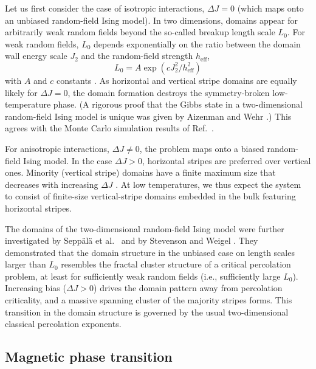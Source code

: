 \documentclass[twocolumn,showpacs,superscriptaddress,aps,prb]{revtex4-2}
\begin{document}
Let us first consider the case of isotropic interactions, $\Delta J = 0$ (which maps onto an unbiased
random-field Ising model). In two dimensions, domains appear for arbitrarily weak random fields
beyond the so-called breakup length scale $L_0$. For weak random fields, $L_0$ depends
exponentially on the ratio between the domain wall energy scale $J_2$ and the random-field strength
$h_\mathrm{eff}$,
\begin{equation}
L_0 = A \exp(c J_2^2/h_\mathrm{eff}^2)
\label{eq:L0}
\end{equation}
with $A$ and $c$ constants \cite{Binder83}. As horizontal and vertical stripe domains are equally likely for $\Delta J =0$,
the domain formation destroys the symmetry-broken low-temperature phase.
(A rigorous proof that the Gibbs state in a two-dimensional random-field Ising model
is unique was given by Aizenman and Wehr \cite{AizenmanWehr89}.) This agrees with the
Monte Carlo simulation results of Ref.\ \cite{KunwarSenVojtaNarayanan18}.

For anisotropic interactions, $\Delta J \ne 0$, the problem maps onto a biased random-field
Ising model. In the case $\Delta J >0$, horizontal stripes are preferred over vertical
ones. Minority (vertical stripe) domains have a finite maximum size that decreases with
increasing $\Delta J$ \cite{Binder83}. At low temperatures, we thus expect the system to
consist of finite-size vertical-stripe domains embedded in the bulk featuring horizontal
stripes.

The domains of the two-dimensional random-field Ising model were further
investigated by Sepp\"al\"a et al.\ \cite{SeppalaPetejaAlava98,*SeppalaAlava01} and by
Stevenson and Weigel \cite{StevensonWeigel11,*StevensonWeigel11b}. They demonstrated that
the domain structure in the unbiased case on length scales larger than $L_0$
resembles the fractal cluster structure of a critical percolation problem, at least for
sufficiently weak random fields (i.e., sufficiently large $L_0$). Increasing bias
($\Delta J >0$) drives the domain pattern away from percolation criticality, and
a massive spanning cluster of the majority stripes forms. This transition in the
domain structure is governed by the usual two-dimensional classical percolation exponents.


\subsection{Magnetic phase transition}
\label{subsec:transition}
\end{document}
